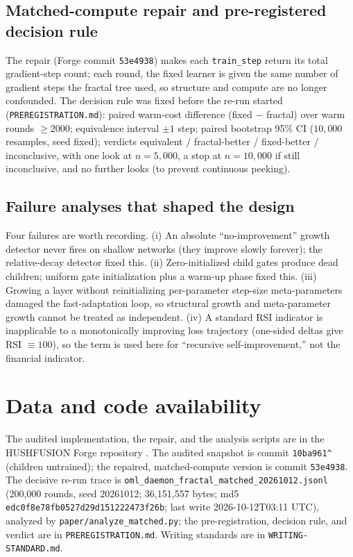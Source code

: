 \documentclass[11pt]{article}
\begin{document}
\subsection{Matched-compute repair and pre-registered decision rule}

The repair (Forge commit \texttt{53e4938}) makes each \texttt{train\_step} return its total gradient-step count; each round, the fixed learner is given the same number of gradient steps the fractal tree used, so structure and compute are no longer confounded. The decision rule was fixed before the re-run started (\texttt{PREREGISTRATION.md}): paired warm-cost difference (fixed $-$ fractal) over warm rounds $\ge 2000$; equivalence interval $\pm 1$ step; paired bootstrap 95\% CI ($10{,}000$ resamples, seed fixed); verdicts equivalent / fractal-better / fixed-better / inconclusive, with one look at $n=5{,}000$, a stop at $n=10{,}000$ if still inconclusive, and no further looks (to prevent continuous peeking).

\subsection{Failure analyses that shaped the design}

Four failures are worth recording. (i) An absolute ``no-improvement'' growth detector never fires on shallow networks (they improve slowly forever); the relative-decay detector fixed this. (ii) Zero-initialized child gates produce dead children; uniform gate initialization plus a warm-up phase fixed this. (iii) Growing a layer without reinitializing per-parameter step-size meta-parameters damaged the fast-adaptation loop, so structural growth and meta-parameter growth cannot be treated as independent. (iv) A standard RSI indicator is inapplicable to a monotonically improving loss trajectory (one-sided deltas give RSI $\equiv100$), so the term is used here for ``recursive self-improvement,'' not the financial indicator.

\section*{Data and code availability}
The audited implementation, the repair, and the analysis scripts are in the HUSHFUSION Forge repository \cite{HushfusionForge}. The audited snapshot is commit \texttt{10ba961\textasciicircum} (children untrained); the repaired, matched-compute version is commit \texttt{53e4938}. The decisive re-run trace is \texttt{oml\_daemon\_fractal\_matched\_20261012.jsonl} (200,000 rounds, seed 20261012; 36,151,557 bytes; md5 \texttt{edc0f8e78fb0527d29d151222473f26b}; last write 2026-10-12T03:11 UTC), analyzed by \texttt{paper/analyze\_matched.py}; the pre-registration, decision rule, and verdict are in \texttt{PREREGISTRATION.md}. Writing standards are in \texttt{WRITING-STANDARD.md}.



\end{document}
